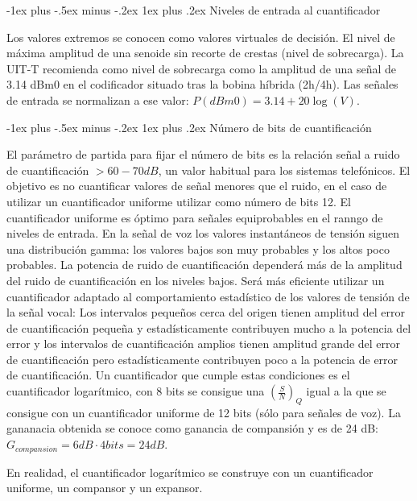 \documentclass[10pt,portrait, twocolumn]{article}
\makeatletter
\renewcommand{\subsubsection}{\@startsection{subsubsection}{3}{0mm}%
                                {-1ex plus -.5ex minus -.2ex}%
                                {1ex plus .2ex}%
                                {\normalfont\small\bfseries}}
\makeatother
\begin{document}
\subsubsection{Niveles de entrada al cuantificador}

Los valores extremos se conocen como valores virtuales de decisión. El nivel de máxima amplitud de una senoide sin recorte de crestas (nivel de sobrecarga). La UIT-T recomienda como nivel de sobrecarga como la amplitud de una señal de 3.14 dBm0 en el codificador situado tras la bobina híbrida (2h/4h). Las señales de entrada se normalizan a ese valor:  $P(dBm0) = 3.14 + 20 \log (V)$.

\subsubsection{Número de bits de cuantificación}

El parámetro de partida para fijar el número de bits es la relación señal a ruido de cuantificación $>60-70dB$, un valor habitual para los sistemas telefónicos. El objetivo es no cuantificar valores de señal menores que el ruido, en el caso de utilizar un cuantificador uniforme utilizar como número de bits 12. El cuantificador uniforme es óptimo para señales equiprobables en el ranngo de niveles de entrada. En la señal de voz los valores instantáneos de tensión siguen una distribución gamma: los valores bajos son muy probables y los altos poco probables. La potencia de ruido de cuantificación dependerá más de la amplitud del ruido de cuantificación en los niveles bajos. Será más eficiente utilizar un cuantificador adaptado al comportamiento estadístico de los valores de tensión de la señal vocal: Los intervalos pequeños cerca del origen tienen amplitud del error de cuantificación pequeña y estadísticamente contribuyen mucho a la potencia del error y los intervalos de cuantificación amplios tienen amplitud grande del error de cuantificación pero estadísticamente contribuyen poco a la potencia de error de cuantificación. Un cuantificador que cumple estas condiciones es el cuantificador logarítmico, con 8 bits se consigue una $(\frac{S}{N})_{Q}$ igual a la que se consigue con un cuantificador uniforme de 12 bits (sólo para señales de voz). La gananacia obtenida se conoce como ganancia de compansión y es de 24 dB: $G_{compansion} = 6 dB \cdot 4 bits = 24 dB$.

En realidad, el cuantificador logarítmico se construye con un cuantificador uniforme, un compansor y un expansor.
\end{document}
